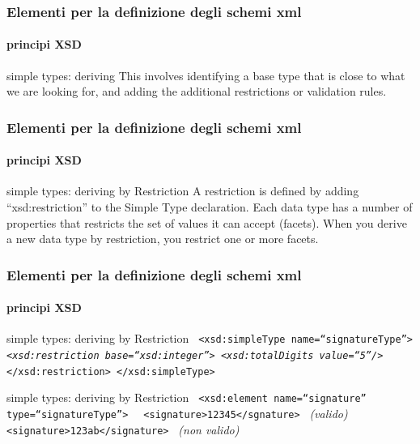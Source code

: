 \begin{frame}
	\frametitle{Elementi per la definizione degli schemi xml}
	\framesubtitle{principi XSD}
	\addtocounter{nframe}{1}

	\begin{block}{simple types: deriving}
		This involves identifying a base type that is close to what we are looking for, and adding the additional restrictions or validation rules.
	\end{block}

\end{frame}

\begin{frame}
	\frametitle{Elementi per la definizione degli schemi xml}
	\framesubtitle{principi XSD}
	\addtocounter{nframe}{1}

	\begin{block}{simple types: deriving by Restriction}
		A restriction is defined by adding ``xsd:restriction'' to the Simple Type declaration. Each data type has a number of properties that restricts the set of values it can accept (facets). When you derive a new data type by restriction, you restrict one or more facets.
	\end{block}

\end{frame}

\begin{frame}
	\frametitle{Elementi per la definizione degli schemi xml}
	\framesubtitle{principi XSD}
	\addtocounter{nframe}{1}

	\begin{block}{simple types: deriving by Restriction}
		\texttt{
			<xsd:simpleType name=``signatureType''>
			\textit{<xsd:restriction base=``xsd:integer''>}
			\textit{<xsd:totalDigits value=``5''/>}
			</xsd:restriction>
			</xsd:simpleType>
		}
	\end{block}

	\begin{block}{simple types: deriving by Restriction}
		\texttt{
			<xsd:element name=``signature'' type=``signatureType''>
		}
		\texttt{
			<signature>12345</sgnature>
		} \textit{(valido)}
		\texttt{
			<signature>123ab</signature>
		} \textit{(non valido)}
	\end{block}
\end{frame}


